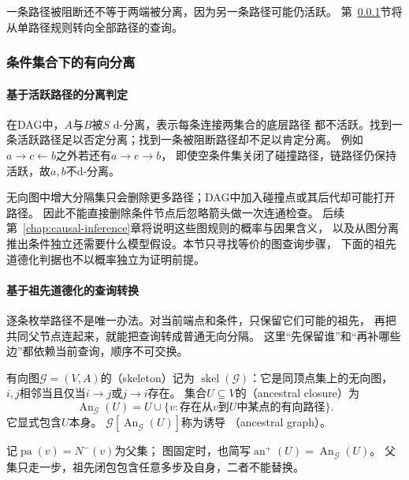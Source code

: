 一条路径被阻断还不等于两端被分离，因为另一条路径可能仍活跃。
第~\ref{sec:graph-theory-conditional-separation}节将从单路径规则转向全部路径的查询。

\subsubsection{条件集合下的有向分离}
\label{sec:graph-theory-conditional-separation}

\paragraph{基于活跃路径的分离判定}

在DAG中，\(A\)与\(B\)被\(S\) d-分离，表示每条连接两集合的底层路径
都不活跃。找到一条活跃路径足以否定分离；找到一条被阻断路径却不足以肯定分离。
例如\(a\to c\leftarrow b\)之外若还有\(a\to e\to b\)，
即使空条件集关闭了碰撞路径，链路径仍保持活跃，故\(a,b\)不d-分离。

无向图中增大分隔集只会删除更多路径；DAG中加入碰撞点或其后代却可能打开路径。
因此不能直接删除条件节点后忽略箭头做一次连通检查。
后续第~\ref{chap:causal-inference}章将说明这些图规则的概率与因果含义，
以及从图分离推出条件独立还需要什么模型假设。本节只寻找等价的图查询步骤，
下面的祖先道德化判据也不以概率独立为证明前提。

\paragraph{基于祖先道德化的查询转换}
\label{sec:graph-theory-directed-transformations}

逐条枚举路径不是唯一办法。对当前端点和条件，只保留它们可能的祖先，
再把共同父节点连起来，就能把查询转成普通无向分隔。
这里“先保留谁”和“再补哪些边”都依赖当前查询，顺序不可交换。

\begin{definition}[骨架、祖先闭包与诱导祖先图]
  \label{def:graph-theory-directed-structure}
  有向图\(\mathcal G=(V,A)\)的（skeleton）记为
  \(\operatorname{skel}(\mathcal G)\)：它是同顶点集上的无向图，
  \(i,j\)相邻当且仅当\(i\to j\)或\(j\to i\)存在。
  集合\(U\subseteq V\)的（ancestral closure）为
  \[
    \operatorname{An}_{\mathcal G}(U)
    =U\cup\{v:\text{存在从\(v\)到\(U\)中某点的有向路径}\}.
  \]
  它显式包含\(U\)本身。
  \(\mathcal G[\operatorname{An}_{\mathcal G}(U)]\)称为诱导
  （ancestral graph）。
\end{definition}

记\(\operatorname{pa}(v)=N^-(v)\)为父集；
图固定时，也简写\(\operatorname{an}^{+}(U)=\operatorname{An}_{\mathcal G}(U)\)。
父集只走一步，祖先闭包包含任意多步及自身，二者不能替换。

